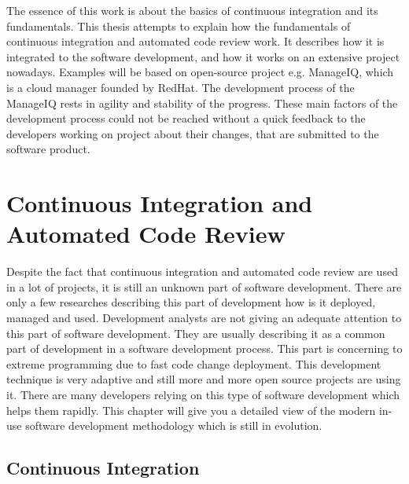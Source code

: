 The essence of this work is about the basics of continuous integration and its fundamentals. This thesis attempts to explain how the fundamentals of continuous integration and automated code review work. It describes how it is integrated to the software development, and how it works on an extensive project nowadays. Examples will be based on open-source project e.g. ManageIQ, which is a cloud manager founded by RedHat. The development process of the ManageIQ rests in agility and stability of the progress. These main factors of the development process could not be reached without a quick feedback to the developers working on project about their changes, that are submitted to the software product.

\chapter{Continuous Integration and Automated Code Review}

Despite the fact that continuous integration and automated code review are used in a lot of projects, it is still an unknown part of software development. There are only a few researches describing this part of development how is it deployed, managed and used. Development analysts are not giving an adequate attention to this part of software development. They are usually describing it as a common part of development in a software development process. This part is concerning to extreme programming due to fast code change deployment. This development technique is very adaptive and still more and more open source projects are using it. There are many developers relying on this type of software development which helps them rapidly. This chapter will give you a detailed view of the modern in-use software development methodology which is still in evolution.

\section{Continuous Integration}

